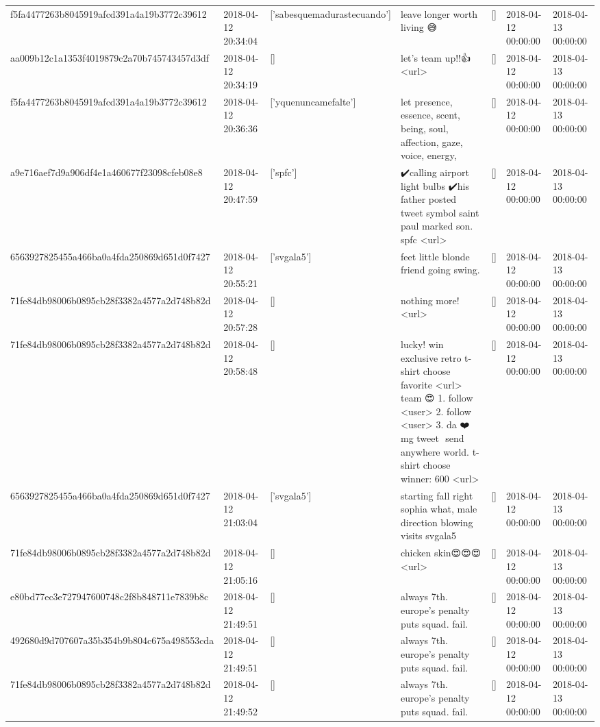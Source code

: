 \begin{tabular}{lllllll}
f5fa4477263b8045919afcd391a4a19b3772c39612 & 2018-04-12 20:34:04 & ['sabesquemadurastecuando'] & leave longer worth living 😅 & [] & 2018-04-12 00:00:00 & 2018-04-13 00:00:00 \\
aa009b12c1a1353f4019879c2a70b745743457d3df & 2018-04-12 20:34:19 & [] & let's team up!!👍 <url> & [] & 2018-04-12 00:00:00 & 2018-04-13 00:00:00 \\
f5fa4477263b8045919afcd391a4a19b3772c39612 & 2018-04-12 20:36:36 & ['yquenuncamefalte'] & let presence, essence, scent, being, soul, affection, gaze, voice, energy, & [] & 2018-04-12 00:00:00 & 2018-04-13 00:00:00 \\
a9e716aef7d9a906df4e1a460677f23098cfeb08e8 & 2018-04-12 20:47:59 & ['spfc'] & ✔️calling airport light bulbs ✔️his father posted tweet symbol saint paul marked son. spfc <url> & [] & 2018-04-12 00:00:00 & 2018-04-13 00:00:00 \\
6563927825455a466ba0a4fda250869d651d0f7427 & 2018-04-12 20:55:21 & ['svgala5'] & feet little blonde friend going swing. & [] & 2018-04-12 00:00:00 & 2018-04-13 00:00:00 \\
71fe84db98006b0895cb28f3382a4577a2d748b82d & 2018-04-12 20:57:28 & [] & nothing more!💜💜💜 <url> & [] & 2018-04-12 00:00:00 & 2018-04-13 00:00:00 \\
71fe84db98006b0895cb28f3382a4577a2d748b82d & 2018-04-12 20:58:48 & [] & lucky! win exclusive retro t-shirt choose favorite <url> team 😍 1. follow <user> 2. follow <user> 3. da ❤️mg tweet ️ send anywhere world. t-shirt choose winner: 600 <url> & [] & 2018-04-12 00:00:00 & 2018-04-13 00:00:00 \\
6563927825455a466ba0a4fda250869d651d0f7427 & 2018-04-12 21:03:04 & ['svgala5'] & starting fall right sophia what, male direction blowing visits svgala5 & [] & 2018-04-12 00:00:00 & 2018-04-13 00:00:00 \\
71fe84db98006b0895cb28f3382a4577a2d748b82d & 2018-04-12 21:05:16 & [] & chicken skin😍😍😍 <url> & [] & 2018-04-12 00:00:00 & 2018-04-13 00:00:00 \\
e80bd77ec3e727947600748c2f8b848711e7839b8c & 2018-04-12 21:49:51 & [] & always 7th. europe's penalty puts squad. fail. & [] & 2018-04-12 00:00:00 & 2018-04-13 00:00:00 \\
492680d9d707607a35b354b9b804c675a498553cda & 2018-04-12 21:49:51 & [] & always 7th. europe's penalty puts squad. fail. & [] & 2018-04-12 00:00:00 & 2018-04-13 00:00:00 \\
71fe84db98006b0895cb28f3382a4577a2d748b82d & 2018-04-12 21:49:52 & [] & always 7th. europe's penalty puts squad. fail. & [] & 2018-04-12 00:00:00 & 2018-04-13 00:00:00 \\

\end{tabular}
